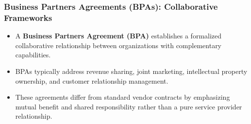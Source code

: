 \documentclass{beamer}
\begin{document}
\begin{frame}
    \frametitle{Business Partners Agreements (BPAs): Collaborative Frameworks}
    
    \begin{itemize}
        \small
        \item A \textbf{Business Partners Agreement (BPA)} establishes a formalized collaborative relationship between organizations with complementary capabilities.
        \item BPAs typically address revenue sharing, joint marketing, intellectual property ownership, and customer relationship management.
        \item These agreements differ from standard vendor contracts by emphasizing mutual benefit and shared responsibility rather than a pure service provider relationship.
    \end{itemize}
    
\end{frame}
\end{document}
